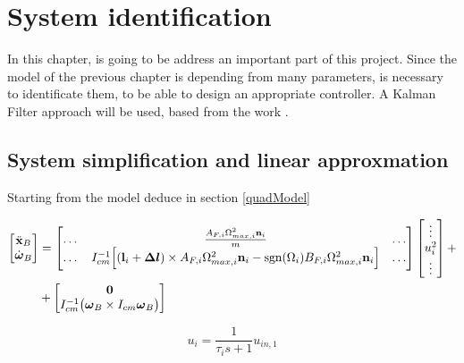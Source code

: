 \chapter{System identification}
\label{systemIdentification}

In this chapter, is going to be address an important part of this project. Since the model of the previous chapter is depending from many parameters, is necessary to identificate them, to be able to design an appropriate controller. A Kalman Filter approach will be used, based from the work \cite{modelIdentification}.

\section{System simplification and linear approxmation}
\label{linearization}

Starting from the model deduce in section \ref{quadModel}

\begin{equation}
	\begin{split}
		\begin{bmatrix}
			\ddot{\mathbf{x}}_B \\
			\dot{\boldsymbol{\omega}}_B
		\end{bmatrix}
		&=
		\begin{bmatrix}
			\dots & \frac{A_{F,i}\Omega_{max,i}^2\mathbf{n}_i}{m} & \dots \\
			\dots & I_{cm}^{-1}\Big[ (\mathbf{l}_i+\boldsymbol{\Delta l})\times A_{F,i}\Omega^2_{max,i}\mathbf{n}_i-\operatorname*{sgn}(\Omega_i)B_{F,i}\Omega_{max,i}^2\mathbf{n}_i\Big] & \dots
		\end{bmatrix}
		\begin{bmatrix}
			\vdots \\
			u_i^2 \\
			\vdots
		\end{bmatrix}
		+ \\
		&+
		\begin{bmatrix}
			\mathbf{0} \\
			I_{cm}^{-1}\bigl(\boldsymbol{\omega}_B \times I_{cm} \boldsymbol{\omega}_B \bigl)
		\end{bmatrix} \\
	\end{split}
	\label{eq:finalModel1a}
\end{equation}

\begin{equation}
	u_i = \frac{1}{\tau_is+1}u_{in,1}
	\label{eq:finalModel2a}
\end{equation}

